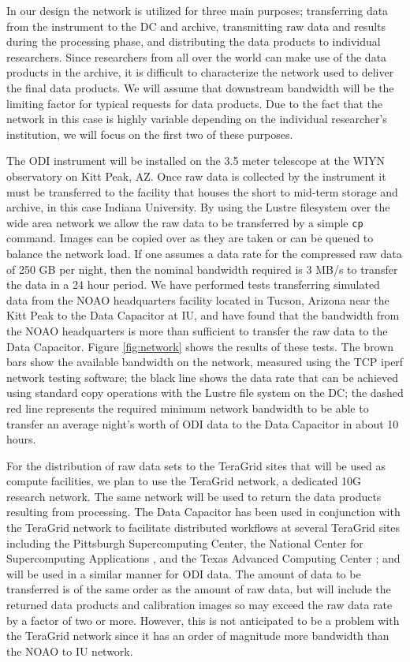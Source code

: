 \documentclass[10pt,conference]{IEEEtran}
\begin{document}
In our design the network is utilized for three main purposes; transferring data from the instrument to the DC and archive, transmitting raw data and results during the processing phase, and distributing the data products to individual researchers. Since researchers from all over the world can make use of the data products in the archive, it is difficult to characterize the network used to deliver the final data products. We will assume that downstream bandwidth will be the limiting factor for typical requests for data products. Due to the fact that the network in this case is highly variable depending on the individual researcher's institution, we will focus on the first two of these purposes. 

The ODI instrument will be installed on the 3.5 meter telescope at the WIYN observatory on Kitt Peak, AZ. Once raw data is collected by the instrument it must be transferred to the facility that houses the short to mid-term storage and archive, in this case Indiana University. By using the Lustre filesystem over the wide area network we allow the raw data to be transferred by a simple {\tt cp} command. Images can be copied over as they are taken or can be queued to balance the network load. If one assumes a data rate for the compressed raw data of 250 GB per night, then the nominal bandwidth required is 3 MB/s to transfer the data in a 24 hour period. We have performed tests transferring simulated data from the NOAO headquarters facility located in Tucson, Arizona near the Kitt Peak to the Data Capacitor at IU, and have found that the bandwidth from the NOAO headquarters is more than sufficient to transfer the raw data to the Data Capacitor. Figure \ref{fig:network} shows the results of these tests. The brown bars show the available bandwidth on the network, measured using the TCP iperf network testing software; the black line shows the data rate that can be achieved using standard copy operations with the Lustre file system on the DC; the dashed red line represents the required minimum network bandwidth to be able to transfer an average night's worth of ODI data to
the Data Capacitor in about 10 hours.

For the distribution of raw data sets to the TeraGrid sites that will be used as compute facilities, we plan to use the TeraGrid network, a dedicated 10G research network. The same network will be used to return the data products resulting from processing. The Data Capacitor has been used in conjunction with the TeraGrid network to facilitate distributed workflows at several TeraGrid sites including the Pittsburgh Supercomputing Center, the National Center for Supercomputing Applications \cite{henschel2010}, and the Texas Advanced Computing Center \cite{horowitz2010}; and will be used in a similar manner for ODI data. The amount of data to be transferred is of the same order as the amount of raw data, but will include the returned data products and calibration images so may exceed the raw data rate by a factor of two or more. However, this is not anticipated to be a problem with the TeraGrid network since it has an order of magnitude more bandwidth than the NOAO to IU network.
\end{document}
